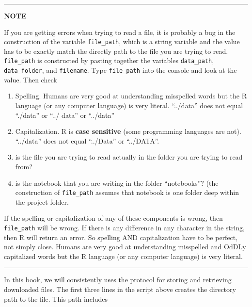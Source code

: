 \documentclass[]{book}
\providecommand{\tightlist}{%
  \setlength{\itemsep}{0pt}\setlength{\parskip}{0pt}}
\begin{document}
\begin{center}\rule{0.5\linewidth}{\linethickness}\end{center}

\textbf{NOTE}

If you are getting errors when trying to read a file, it is probably a
bug in the construction of the variable \texttt{file\_path}, which is a
string variable and the value has to be exactly match the directly path
to the file you are trying to read. \texttt{file\_path} is constructed
by pasting together the variables \texttt{data\_path},
\texttt{data\_folder}, and \texttt{filename}. Type \texttt{file\_path}
into the console and look at the value. Then check

\begin{enumerate}
\def\labelenumi{\arabic{enumi}.}
\tightlist
\item
  Spelling. Humans are very good at understanding misspelled words but
  the R language (or any computer language) is very literal. ``../data''
  does not equal ``./data'' or ``../ data'' or ``../data''
\item
  Capitalization. R is \textbf{case sensitive} (some programming
  languages are not). ``../data'' does not equal ``../Data'' or
  ``../DATA''.
\item
  is the file you are trying to read actually in the folder you are
  trying to read from?
\item
  is the notebook that you are writing in the folder ``notebooks''? (the
  construction of \texttt{file\_path} assumes that notebook is one
  folder deep within the project folder.
\end{enumerate}

If the spelling or capitalization of any of these components is wrong,
then \texttt{file\_path} will be wrong. If there is any difference in
any character in the string, then R will return an error. So spelling
AND capitalization have to be perfect, not simply close. Humans are very
good at understanding misspelled and OdDLy capitalized words but the R
language (or any computer language) is very literal.

\begin{center}\rule{0.5\linewidth}{\linethickness}\end{center}

In this book, we will consistently uses the protocol for storing and
retrieving downloaded files. The first three lines in the script above
creates the directory path to the file. This path includes
\end{document}
